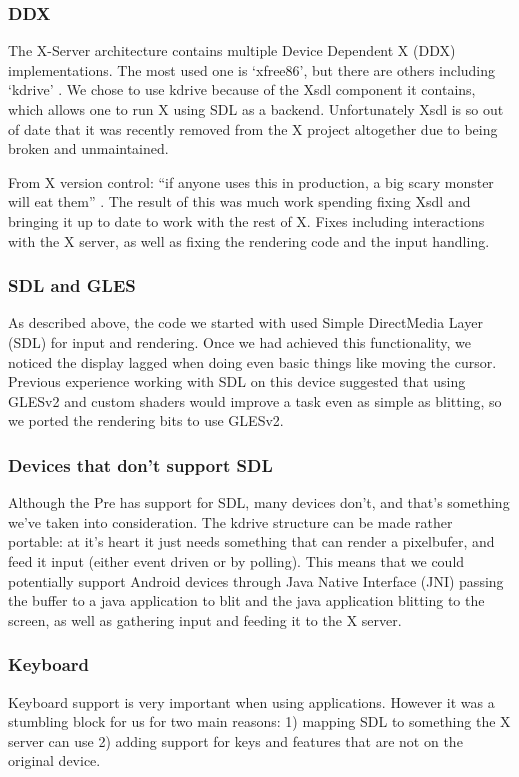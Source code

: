 \subsubsection{DDX}
The X-Server architecture contains multiple Device Dependent X (DDX) implementations.  The most used one is `xfree86', but there are others including `kdrive' \cite{x_glossary}.  We chose to use kdrive because of the Xsdl component it contains, which allows one to run X using SDL as a backend.  Unfortunately Xsdl is so out of date that it was recently removed from the X project altogether due to being broken and unmaintained.

From X version control: ``if anyone uses this in production, a big scary monster will eat them'' \cite{x_quote}.  The result of this was much work spending fixing Xsdl and bringing it up to date to work with the rest of X.  Fixes including interactions with the X server, as well as fixing the rendering code and the input handling.
\subsubsection{SDL and GLES}
As described above, the code we started with used Simple DirectMedia Layer (SDL) \cite{sdl} for input and rendering.  Once we had achieved this functionality, we noticed the display lagged when doing even basic things like moving the cursor.  Previous experience working with SDL on this device suggested that using GLESv2 \cite{gles} and custom shaders would improve a task even as simple as blitting, so we ported the rendering bits to use GLESv2.

\subsubsection{Devices that don't support SDL}
Although the Pre has support for SDL, many devices don't, and that's something we've taken into consideration.  The kdrive structure can be made rather portable: at it's heart it just needs something that can render a pixelbufer, and feed it input (either event driven or by polling).  This means that we could potentially support Android devices through Java Native Interface (JNI) \cite{jni} passing the buffer to a java application to blit and the java application blitting to the screen, as well as gathering input and feeding it to the X server.
\subsubsection{Keyboard}
Keyboard support is very important when using applications.  However it was a stumbling block for us for two main reasons: 1) mapping SDL to something the X server can use 2) adding support for keys and features that are not on the original device.\\

